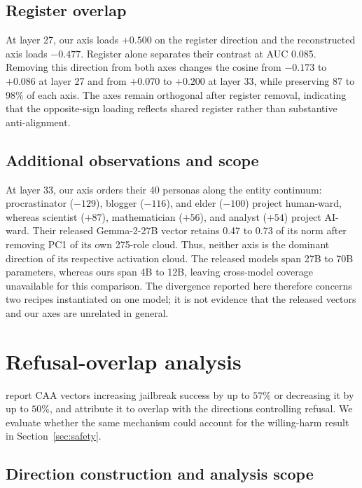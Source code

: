 \subsection{Register overlap}

At layer 27, our axis loads $+0.500$ on the register direction and the
reconstructed axis loads $-0.477$. Register alone separates their contrast at
AUC 0.085. Removing this direction from both axes changes the cosine from
$-0.173$ to $+0.086$ at layer 27 and from $+0.070$ to $+0.200$ at layer 33,
while preserving 87 to 98\% of each axis. The axes remain orthogonal after
register removal, indicating that the opposite-sign loading reflects shared
register rather than substantive anti-alignment.

\subsection{Additional observations and scope}

At layer 33, our axis orders their 40 personas along the entity continuum:
procrastinator ($-129$), blogger ($-116$), and elder ($-100$) project
human-ward, whereas scientist ($+87$), mathematician ($+56$), and analyst
($+54$) project AI-ward. Their released Gemma-2-27B vector retains 0.47 to 0.73
of its norm after removing PC1 of its own 275-role cloud. Thus, neither axis is
the dominant direction of its respective activation cloud. The released models
span 27B to 70B parameters, whereas ours span 4B to 12B, leaving cross-model
coverage unavailable for this comparison. The divergence reported here
therefore concerns two recipes instantiated on one model; it is not evidence
that the released vectors and our axes are unrelated in general.

\section{Refusal-overlap analysis}
\label{app:refusal}

\citet{li2026pitfalls} report CAA vectors \citep{panickssery2023caa} increasing jailbreak
success by up to $57\%$ or decreasing it by up to $50\%$, and attribute it to overlap with the
directions controlling refusal. We evaluate whether the same mechanism could
account for the willing-harm result in Section~\ref{sec:safety}.

\subsection{Direction construction and analysis scope}


